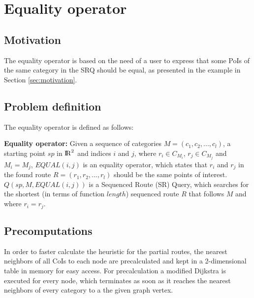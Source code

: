



\section{Equality operator}
\label{ch:EO}

\subsection{Motivation} 
The equality operator is based on the need of a user to express that some PoIs of the same category in the SRQ should be equal, as presented in the example in Section \ref{sec:motivation}.

\subsection{Problem definition} 
\label{sec:problemEO}
The equality operator is defined as follows:

\textbf{Equality operator:} Given a sequence of categories $M = (c_1, c_2, ..., c_l)$, a starting point $sp$ in ${\rm I\!R}^2$ and indices $i$ and $j$, where $r_i \in C_{M_{i}}$, $r_j \in C_{M_{j}}$ and $M_i = M_j$, $EQUAL(i, j)$ is an equality operator, which states that $r_i$ and $r_j$ in the found route $R = (r_1, r_2, ..., r_l)$ should be the same points of interest.
$Q(sp, M, EQUAL(i, j))$ is a Sequenced Route (SR) Query, which searches for the shortest (in terms of function $length$) sequenced route $R$ that follows $M$ and where $r_i = r_j$.

\subsection{Precomputations} 
\label{sec:precompEO}
In order to faster calculate the heuristic for the partial routes, the nearest neighbors of all CoIs to each node are precalculated and kept in a 2-dimensional table in memory for easy access. For precalculation a modified Dijkstra is executed for every node, which terminates as soon as it reaches the nearest neighbors of every category to a the given graph vertex.

